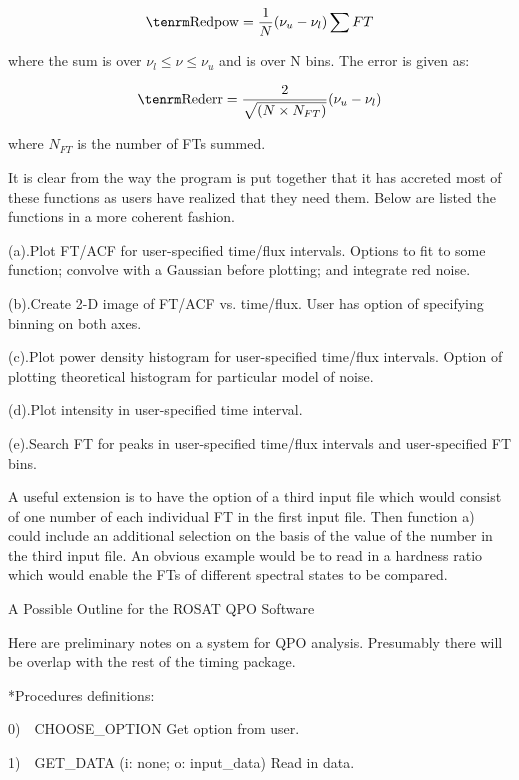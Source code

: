 $${\rm Redpow} = {1\over N}(\nu_{u}-\nu_{l})\sum FT$$

where the sum is over $\nu_{l}\leq\nu\leq\nu_{u}$ and is over N bins.
The error is given as:

$${\rm Rederr} = {2\over \sqrt{(N\times N_{FT})}}(\nu_{u}-\nu_{l})$$

where $N_{FT}$ is the number of FTs summed.

It is clear from the way the program is put together that it has
accreted most of these functions as users have realized that they need
them.  Below are listed the functions in a more coherent fashion.


\item{(a).}Plot FT/ACF for user-specified time/flux intervals.  Options to fit
to some function; convolve with a Gaussian before plotting; and
integrate red noise.

\item{(b).}Create 2-D image of FT/ACF vs. time/flux.  User has option of
specifying binning on both axes.

\item{(c).}Plot power density histogram for user-specified time/flux
intervals.  Option of plotting theoretical histogram for particular
model of noise.

\item{(d).}Plot intensity in user-specified time interval.

\item{(e).}Search FT for peaks in user-specified time/flux intervals and
user-specified FT bins.

A useful extension is to have the option of a third input file which
would consist of one number of each individual FT in the first input
file.  Then function a) could include an additional selection on
the basis of the value of the number in the third input file.  An
obvious example would be to read in a hardness ratio which would
enable the FTs of different spectral states to be compared.

\@{A Possible Outline for the ROSAT QPO Software}

Here are preliminary notes on a system for QPO analysis.  Presumably
there will be overlap with the rest of the timing package.

\**Procedures definitions:


\item{0)}~~CHOOSE\_OPTION
\itemitem{}Get option from user.

\item{1)}~~GET\_DATA (i: none; o: input\_data)
\itemitem{}Read in data.

